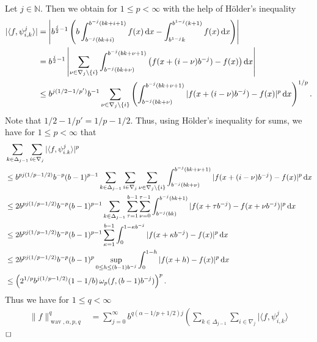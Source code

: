 \documentclass[12pt]{article}
\DeclareMathOperator{\wav}{wav}
\newenvironment{proof}{\begin{trivlist}
    \item[\hskip\labelsep{\it Proof.}]}{$\hfill\Box$\end{trivlist}}
\newcommand{\NN}{\mathbb{N}}
\begin{document}
\begin{proof}
Let $j\in\NN$. Then we obtain for $1 \le p < \infty$ with the help of H\"older's inequality
\begin{equation*}
 \begin{split}
  |\langle f, \psi^j_{i,k}\rangle | 
 &=
 \left| b^{\frac{j}{2}-1} \left( b
\int_{b^{-j}(bk+i)}^{b^{-j}(bk+i+1)} f(x) \,{\rm d}x 
- \int_{b^{1-j}k}^{b^{1-j}(k+1)} f(x) \,{\rm d}x 
 \right) \right|\\ 
&=
b^{\frac{j}{2}-1} \left| \sum_{\nu\in \nabla_j\setminus\{i\}}
\int_{b^{-j}(bk+\nu)}^{b^{-j}(bk+\nu+1)} \big(f(x+(i-\nu)b^{-j}) -f(x)\big)
\,{\rm d}x \right|\\
&\le b^{j(1/2 - 1/p')} b^{-1} \sum_{\nu\in \nabla_j\setminus\{i\}}
\left( \int_{b^{-j}(bk+\nu)}^{b^{-j}(bk+\nu+1)} |f(x+(i-\nu)b^{-j}) -f(x)|^p
\,{\rm d}x \right)^{1/p}.
 \end{split}
\end{equation*}
Note that $1/2-1/p' = 1/p-1/2$. Thus, using H\"older's inequality for sums, we have for $1\le p <\infty$ that
\begin{equation*}
 \begin{split}
  &\sum_{k\in\Delta_{j-1}} \sum_{i\in\nabla_j}
|\langle f, \psi^j_{i.k}\rangle |^p \\
&\le b^{p j (1/p - 1/2)} b^{-p} (b-1)^{p-1}  \sum_{k\in\Delta_{j-1}} \sum_{i\in\nabla_j}
\sum_{\nu\in \nabla_j\setminus\{i\}} \int_{b^{-j}(bk+\nu)}^{b^{-j}(bk+\nu+1)} |f(x+(i-\nu)b^{-j}) -f(x)|^p \,{\rm d}x \\ 
& \le 2 b^{p j(1/p-1/2)} b^{-p} (b-1)^{p-1}
\sum_{k\in\Delta_{j-1}} \sum_{\tau=1}^{b-1} \sum_{\nu=0}^{\tau-1}
\int_{b^{-j}(bk)}^{b^{-j}(bk+1)} |f(x+ \tau b^{-j}) -f(x + \nu b^{-j})|^p
\,{\rm d}x \\ 
&\le 2 b^{p j (1/p - 1/2)} b^{-p} (b-1)^{p-1} \sum_{\kappa=1}^{b-1}
\int_{0}^{1-\kappa b^{-j}} |f(x+ \kappa b^{-j}) -f(x)|^p \,{\rm d}x \\
&\le 2 b^{p j (1/p - 1/2)} b^{-p} (b-1)^{p} \sup_{0\le h \le (b-1)b^{-j}}
\int_0^{1-h} |f(x+h) -f(x)|^p \, {\rm d}x \\
&\le \left( 2^{1/p} b^{j (1/p - 1/2)} (1-1/b)\, \omega_p(f,(b-1)b^{-j}) \right)^p.
 \end{split}
\end{equation*}
Thus we have for $1\le q <\infty$
\begin{equation*}
 \begin{split}
\|f\|^q_{\wav, \alpha,p,q} &= \sum_{j=0}^{\infty} b^{q (\alpha-1/p+1/2) j} \left(
\sum_{k\in\Delta_{j-1}} \sum_{i\in\nabla_j} |\langle f, \psi_{i,k}^{j} \rangle

\end{split}
\end{equation*}
\end{proof}
\end{document}
